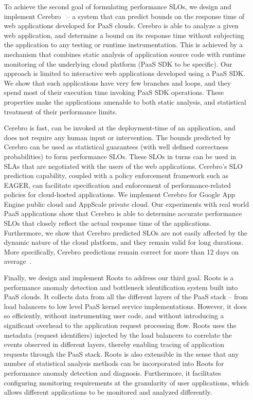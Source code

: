 To achieve the second goal of formulating performance SLOs, we design and implement 
Cerebro~\cite{Jayathilaka:2015:RTS:2806777.2806842} --
a system that can predict bounds on the response time of web applications developed for PaaS clouds.
Cerebro is able to analyze a given web application, and determine a bound on its response time without
subjecting the application to any testing or runtime instrumentation. This is achieved by a mechanism
that combines static analysis of application source code with runtime monitoring of the underlying
cloud platform (PaaS SDK to be specific). Our approach is limited to interactive web applications
developed using a PaaS SDK. We show that such applications have very few branches and loops, 
and they spend most of their execution time invoking PaaS SDK operations. These properties
make the applications amenable to both static analysis, and statistical treatment of their 
performance limits.

Cerebro is fast, can be invoked at the deployment-time 
of an application, and does not require any human input or intervention. 
The bounds predicted by Cerebro can be used as statistical guarantees (with well defined correctness
probabilities) to form performance SLOs. These SLOs in turns can be used in SLAs that are negotiated
with the users of the web applications. Cerebro's SLO prediction capability, coupled with a policy
enforcement framework such as EAGER, can facilitate specification and enforcement of performance-related
policies for cloud-hosted applications. We implement Cerebro for Google App Engine public cloud
and AppScale private cloud. Our experiments with real world PaaS applications show that Cerebro
is able to determine accurate performance SLOs that closely reflect the actual response time
of the applications. Furthermore, we show that Cerebro predicted SLOs are not easily affected by
the dynamic nature of the cloud platform, and they remain valid for long durations. More specifically, 
Cerebro predictions remain correct for more than 12 days on average~\cite{7396174}. 

Finally, we design and implement Roots to address our third goal. Roots is a performance anomaly detection and 
bottleneck identification system built into PaaS clouds. It collects data from all the different layers of the
PaaS stack -- from load balancers to low level PaaS kernel service implementations. However,
it does so efficiently, without instrumenting user code, and without introducing a significant
overhead to the application request processing flow. 
Roots uses the metadata (request identifiers) injected by the load balancers to correlate the
events observed in different layers, 
thereby enabling tracing of application requests through the PaaS stack.
Roots is also extensible in the sense that 
any number of statistical analysis methods can be incorporated into Roots for performance
anomaly detection and diagnosis. Furthermore, it facilitates configuring monitoring requirements
at the granularity of user applications, which allows different applications to be monitored
and analyzed differently. 

